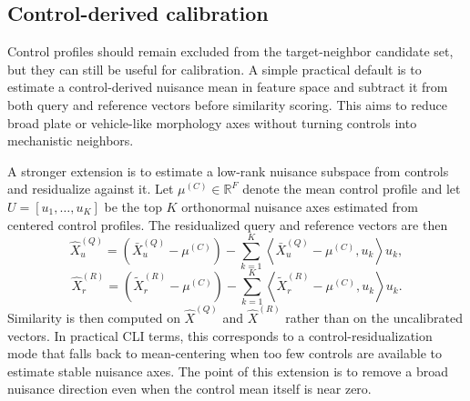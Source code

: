 \documentclass[11pt]{article}
\begin{document}
\subsection{Control-derived calibration}
Control profiles should remain excluded from the target-neighbor candidate set, but they can still be useful for calibration. A simple practical default is to estimate a control-derived nuisance mean in feature space and subtract it from both query and reference vectors before similarity scoring. This aims to reduce broad plate or vehicle-like morphology axes without turning controls into mechanistic neighbors.

A stronger extension is to estimate a low-rank nuisance subspace from controls and residualize against it. Let $\mu^{(C)} \in \mathbb{R}^{F}$ denote the mean control profile and let $U = [u_1,\dots,u_K]$ be the top $K$ orthonormal nuisance axes estimated from centered control profiles. The residualized query and reference vectors are then
\[
\hat{X}^{(Q)}_u = \left(\bar{X}^{(Q)}_u - \mu^{(C)}\right) - \sum_{k=1}^{K} \left\langle \bar{X}^{(Q)}_u - \mu^{(C)}, u_k \right\rangle u_k,
\]
\[
\hat{X}^{(R)}_r = \left(\tilde{X}^{(R)}_r - \mu^{(C)}\right) - \sum_{k=1}^{K} \left\langle \tilde{X}^{(R)}_r - \mu^{(C)}, u_k \right\rangle u_k.
\]
Similarity is then computed on $\hat{X}^{(Q)}$ and $\hat{X}^{(R)}$ rather than on the uncalibrated vectors. In practical CLI terms, this corresponds to a control-residualization mode that falls back to mean-centering when too few controls are available to estimate stable nuisance axes. The point of this extension is to remove a broad nuisance direction even when the control mean itself is near zero.
\end{document}
